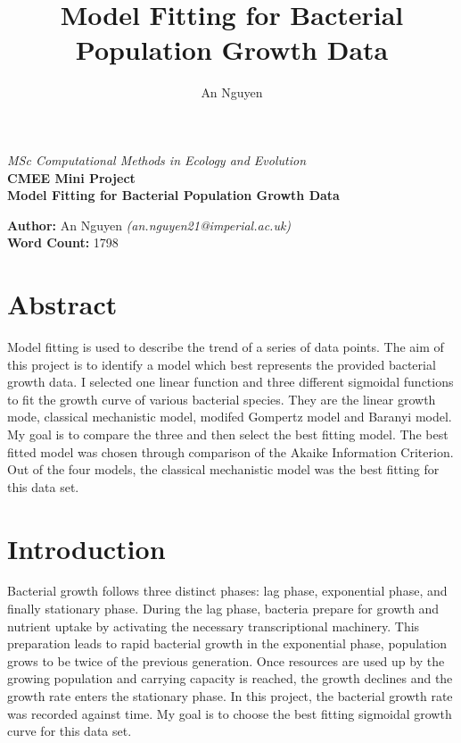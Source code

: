 \documentclass[11pt]{article}
\title{Model Fitting for Bacterial Population Growth Data}
\author{An Nguyen}
\begin{document}
\begin{titlepage}

        \centering
		\vspace*{2cm}
		\Large
		\emph{MSc Computational Methods in Ecology and Evolution}\\
		\vspace*{1cm}
		\Large
		\textbf{CMEE Mini Project}\\
		
		\vspace*{3cm}
		\Huge
		\textbf{Model Fitting for Bacterial Population Growth Data}\\
		
		\vspace{3cm}
		\Large
		
		\textbf{Author:} An Nguyen \textit{(an.nguyen21@imperial.ac.uk)}\\
		\vspace*{1cm}
		\textbf{Word Count:} 1798

	\end{titlepage}
\newpage
\tableofcontents
\newpage
{}
\section*{Abstract}
Model fitting is used to describe the trend of a series of data points.  The aim of this project is to identify a model which best represents the provided bacterial growth data. I selected one linear function and three different sigmoidal functions to fit the growth curve of various bacterial species. They are the linear growth mode, classical mechanistic model, modifed Gompertz model and Baranyi model. My goal is to compare the three and then select the best fitting model. The best fitted model was chosen through comparison of the Akaike Information Criterion. Out of the four models, the classical mechanistic model was the best fitting for this data set. 

\newpage
\section{Introduction}

Bacterial growth follows three distinct phases: lag phase, exponential phase, and finally stationary phase. During the lag phase, bacteria prepare for growth and nutrient uptake by activating the necessary transcriptional machinery. This preparation leads to rapid bacterial growth in the exponential phase, population grows to be twice of the previous generation. Once resources are used up by the growing population and carrying capacity is reached, the growth declines and the growth rate enters the stationary phase. In this project, the bacterial growth rate was recorded against time. My goal is to choose the best fitting sigmoidal growth curve for this data set. 
\end{document}
